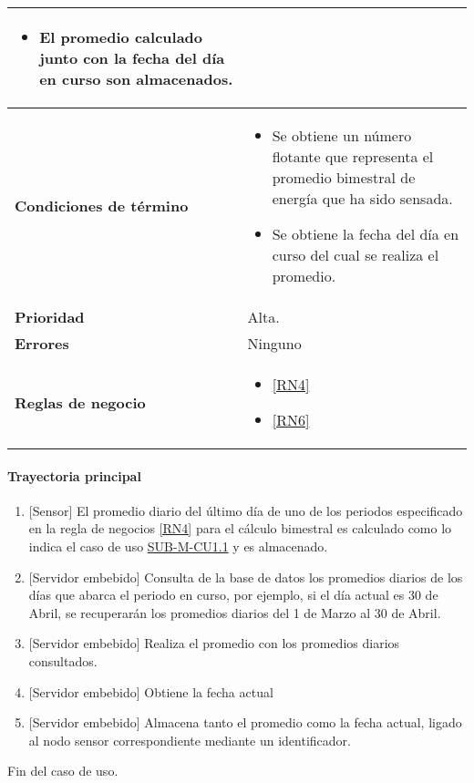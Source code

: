 \begin{longtable}{|J{5cm}|J{10.3cm}|}
\begin{itemize}
			\item El promedio calculado junto con la fecha del día en curso son almacenados.
		\end{itemize}\\ \hline
	\textbf{Condiciones de término} & 
		\begin{itemize}
			\item Se obtiene un número flotante que representa el promedio bimestral de energía que ha sido sensada.
			\item Se obtiene la fecha del día en curso del cual se realiza el promedio.
		\end{itemize} \\ \hline 
	\textbf{Prioridad} & 
		Alta. \\ \hline
	\textbf{Errores} & 
		Ninguno \\ \hline
	\textbf{Reglas de negocio} & 
		\begin{itemize}
			\item \ref{RN4}
			\item \ref{RN6}
		\end{itemize} \\ \hline

\end{longtable}

\paragraph{Trayectoria principal}
	\begin{enumerate}
		\item {[Sensor]} El promedio diario del último día de uno de los periodos especificado en la regla de negocios \ref{RN4} para el cálculo bimestral es calculado como lo indica el caso de uso \hyperref[SUB-M-CU1.1]{SUB-M-CU1.1} y es almacenado.
		\item  {[Servidor embebido]} Consulta de la base de datos los promedios diarios de los días que abarca el periodo en curso, por ejemplo, si el día actual es 30 de Abril, se recuperarán los promedios diarios del 1 de Marzo al 30 de Abril.
		\item {[Servidor embebido]} Realiza el promedio con los promedios diarios consultados.
		\item {[Servidor embebido]} Obtiene la fecha actual
		\item {[Servidor embebido]} Almacena tanto el promedio como la fecha actual, ligado al nodo sensor correspondiente mediante un identificador.
	\end{enumerate}
	Fin del caso de uso.
